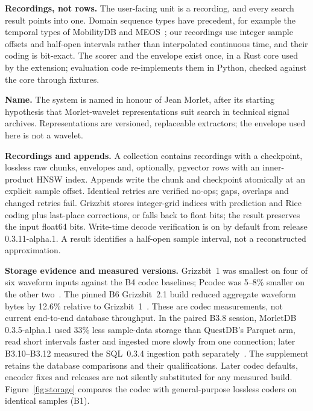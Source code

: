 \documentclass[sigconf]{acmart}
\begin{document}
\textbf{Recordings, not rows.} The user-facing unit is a recording, and every search result points into one. Domain sequence types have precedent, for example the temporal types of MobilityDB and MEOS~\cite{mobilitydb,meos}; our recordings use integer sample offsets and half-open intervals rather than interpolated continuous time, and their coding is bit-exact. The scorer and the envelope exist once, in a Rust core used by the extension; evaluation code re-implements them in Python, checked against the core through fixtures.

\ifdefined\SigmodSubmission\else
\textbf{Name.} The system is named in honour of Jean Morlet, after its starting hypothesis that Morlet-wavelet representations suit search in technical signal archives. Representations are versioned, replaceable extractors; the envelope used here is not a wavelet.
\fi

\textbf{Recordings and appends.} A collection contains recordings with a checkpoint, lossless raw chunks, envelopes and, optionally, pgvector  rows with an inner-product HNSW index. Appends write the chunk and checkpoint atomically at an explicit sample offset. Identical retries are verified no-ops; gaps, overlaps and changed retries fail. Grizzbit stores integer-grid indices with prediction and Rice coding plus last-place corrections, or falls back to float bits; the result preserves the input float64 bits. Write-time decode verification is on by default from release 0.3.11-alpha.1. A result identifies a half-open sample interval, not a reconstructed approximation.

\textbf{Storage evidence and measured versions.} Grizzbit~1 was smallest on four of six waveform inputs against the B4 codec baselines; Pcodec was 5--8\% smaller on the other two~\cite{b4}. The pinned B6 Grizzbit~2.1 build reduced aggregate waveform bytes by 12.6\% relative to Grizzbit~1~\cite{b6}. These are codec measurements, not current end-to-end database throughput. In the paired B3.8 session, MorletDB 0.3.5-alpha.1 used 33\% less sample-data storage than QuestDB's Parquet arm, read short intervals faster and ingested more slowly from one connection; later B3.10--B3.12 measured the SQL~0.3.4 ingestion path separately~\cite{b3}. The supplement retains the database comparisons and their qualifications. Later codec defaults, encoder fixes and releases are not silently substituted for any measured build. Figure~\ref{fig:storage} compares the codec with general-purpose lossless coders on identical samples (B1).
\end{document}
